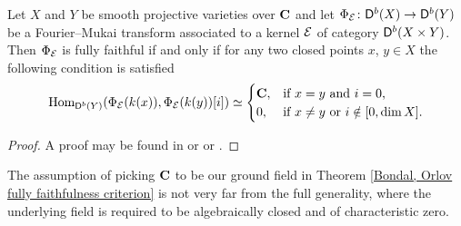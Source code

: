 \begin{theorem}
    \label{Bondal, Orlov fully faithfulness criterion}
    \emph{\cite{BondalOrlov1995}}
    Let $X$ and $Y$ be smooth projective varieties over $\mathbf C$ and let $\Phi_{\mathcal E} \colon \mathsf{D}^b(X) \to \mathsf{D}^b(Y)$ be a Fourier--Mukai transform associated to a kernel $\mathcal E$ of category $\mathsf{D}^b(X \times Y)$. Then $\Phi_{\mathcal E}$ is fully faithful if and only if for any two closed points $x$, $y \in X$ the following condition is satisfied
    \begin{equation}
        \label{eq: Bondal, Orlov conditions}
        \mathrm{Hom}_{\mathsf{D}^b(Y)}(\Phi_{\mathcal E}(k(x)), \Phi_{\mathcal E}(k(y))[i]) \simeq \begin{cases}
            \mathbf C, &\text{if $x = y$ and $i = 0$,} \\
            0, &\text{if $x \neq y$ or $i \notin [0, \dim X]$.}
        \end{cases}
    \end{equation}
\end{theorem}

\begin{proof}
    A proof may be found in \cite[\S 7, Proposition 7.1]{huybrechts2006fouriermukai} or \cite[Theorem 1.1]{BondalOrlov1995} or \cite[Theorem 5.1]{bridgeland2019equivalencestriangulatedcategoriesfouriermukai}.
\end{proof}

\begin{remark}        
    The assumption of picking $\mathbf C$ to be our ground field in Theorem \ref{Bondal, Orlov fully faithfulness criterion} is not very far from the full generality, where the underlying field is required to be algebraically closed and of characteristic zero.
\end{remark}

